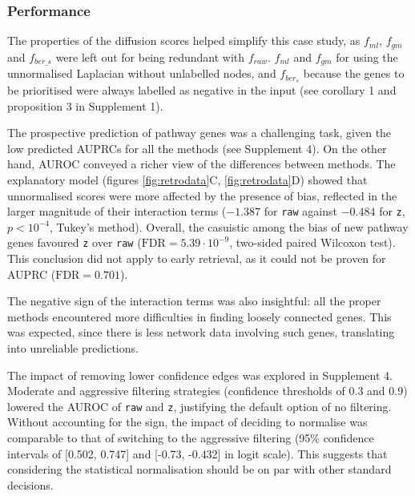\documentclass[final]{bioinfo}
\newcommand{\method}{\texttt}
\begin{document}
\subsubsection*{Performance}

The properties of the diffusion scores helped simplify this case study, as $f_{ml}$, $f_{gm}$ and $f_{ber\_s}$ were left out for being redundant with $f_{raw}$.
$f_{ml}$ and $f_{gm}$ for using the unnormalised Laplacian without unlabelled nodes, and $f_{ber_s}$ because the genes to be prioritised were always labelled as negative in the input (see corollary 1 and proposition 3 in Supplement 1).

The prospective prediction of pathway genes was a challenging task, given the low predicted AUPRCs for all the methods (see Supplement 4). 
On the other hand, AUROC conveyed a richer view of the differences between methods. 
The explanatory model (figures \ref{fig:retrodata}C, \ref{fig:retrodata}D) showed that unnormalised scores were more affected by the presence of bias, reflected in the larger magnitude of their interaction terms ($-1.387$ for \method{raw} against $-0.484$ for \method{z}, $p<10^{-4}$, Tukey's method). 
Overall, the casuistic among the bias of new pathway genes favoured \method{z} over \method{raw} ($ \textrm{FDR}=5.39\cdot 10^{-9}$, two-sided paired Wilcoxon test). 
This conclusion did not apply to early retrieval, as it could not be proven for AUPRC ($\textrm{FDR} = 0.701$).

The negative sign of the interaction terms was also insightful: all the proper methods encountered more difficulties in finding loosely connected genes.
This was expected, since there is less network data involving such genes, translating into unreliable predictions.

The impact of removing lower confidence edges was explored in Supplement 4. 
Moderate and aggressive filtering strategies (confidence thresholds of $0.3$ and $0.9$) lowered the AUROC of \method{raw} and \method{z}, justifying the default option of no filtering.
Without accounting for the sign, the impact of deciding to normalise was comparable to that of switching to the aggressive filtering (95\% confidence intervals of [0.502, 0.747] and [-0.73, -0.432] in logit scale).
This suggests that considering the statistical normalisation should be on par with other standard decisions.
\end{document}

